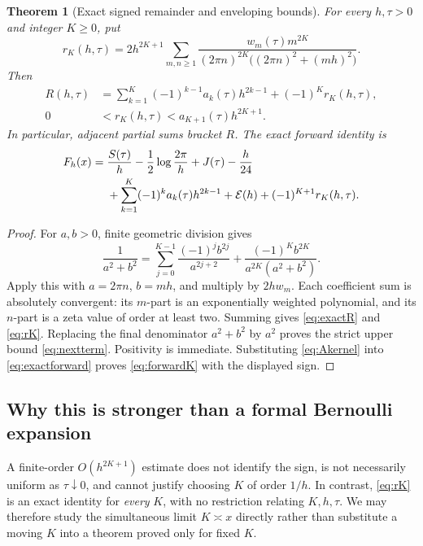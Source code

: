 \documentclass[11pt,a4paper]{article}
\newtheorem{theorem}{Theorem}[section]
\theoremstyle{definition}
\theoremstyle{remark}
\newcommand{\Ecal}{\mathcal E}
\begin{document}
\begin{theorem}[Exact signed remainder and enveloping bounds]
\label{thm:remainder}
For every $h,\tau>0$ and integer $K\ge0$, put
\begin{equation}
 r_K(h,\tau)=2h^{2K+1}\sum_{m,n\ge1}
 \frac{w_m(\tau)m^{2K}}
 {(2\pi n)^{2K}\bigl((2\pi n)^2+(mh)^2\bigr)}.
 \label{eq:rK}
\end{equation}
Then
\begin{align}
 R(h,\tau)&=\sum_{k=1}^K(-1)^{k-1}a_k(\tau)h^{2k-1}
                      +(-1)^K r_K(h,\tau),\label{eq:exactR}\\
 0&<r_K(h,\tau)<a_{K+1}(\tau)h^{2K+1}.\label{eq:nextterm}
\end{align}
In particular, adjacent partial sums bracket $R$. The exact forward
identity is
\begin{align}
 F_h(x)={}&\frac{S(\tau)}h-\frac12\log\frac{2\pi}{h}
 +J(\tau)-\frac h{24}\notag\\
 &+\sum_{k=1}^K(-1)^ka_k(\tau)h^{2k-1}
 +\Ecal(h)+(-1)^{K+1}r_K(h,\tau).
 \label{eq:forwardK}
\end{align}
\end{theorem}
\begin{proof}
For $a,b>0$, finite geometric division gives
\[
 \frac1{a^2+b^2}
 =\sum_{j=0}^{K-1}\frac{(-1)^jb^{2j}}{a^{2j+2}}
  +\frac{(-1)^Kb^{2K}}{a^{2K}(a^2+b^2)}.
\]
Apply this with $a=2\pi n$, $b=mh$, and multiply by $2h w_m$.
Each coefficient sum is absolutely convergent: its $m$-part is an
exponentially weighted polynomial, and its $n$-part is a zeta value of
order at least two. Summing gives \eqref{eq:exactR} and \eqref{eq:rK}.
Replacing the final denominator $a^2+b^2$ by $a^2$ proves the strict
upper bound \eqref{eq:nextterm}. Positivity is immediate. Substituting
\eqref{eq:Akernel} into \eqref{eq:exactforward} proves
\eqref{eq:forwardK} with the displayed sign.
\end{proof}

\subsection{Why this is stronger than a formal Bernoulli expansion}
A finite-order $O(h^{2K+1})$ estimate does not identify the sign, is not
necessarily uniform as $\tau\downarrow0$, and cannot justify choosing
$K$ of order $1/h$. In contrast, \eqref{eq:rK} is an exact identity for
\emph{every} $K$, with no restriction relating $K,h,\tau$. We may therefore
study the simultaneous limit $K\asymp x$ directly rather than substitute a
moving $K$ into a theorem proved only for fixed $K$.
\end{document}
